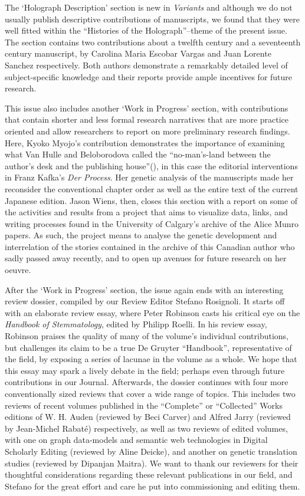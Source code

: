 \begin{preface}
The `Holograph Description' section is new in \emph{Variants} and although we do not usually publish descriptive contributions of manuscripts, we found that they were well fitted within the ``Histories of the Holograph''--theme of the present issue. The section contains two contributions about a twelfth century and a seventeenth century manuscript, by Carolina Maria Escobar Vargas and Juan Lorente Sanchez respectively. Both authors demonstrate a remarkably detailed level of subject-specific knowledge and their reports provide ample incentives for future research. 

This issue also includes another `Work in Progress' section, with contributions that contain shorter and less formal research narratives that are more practice oriented and allow researchers to report on more preliminary research findings. Here, Kyoko Myojo's contribution demonstrates the importance of examining what Van Hulle and Beloborodova called the ``no-man's-land between the author's desk and the publishing house''(\pageref{qtVanhulle2}), in this case the editorial interventions in Franz Kafka's \emph{Der Process}. Her genetic analysis of the manuscripts made her reconsider the conventional chapter order as well as the entire text of the current Japanese edition. Jason Wiens, then, closes this section with a report on some of the activities and results from a project that aims to visualize data, links, and writing processes found in the University of Calgary's archive of the Alice Munro papers. As such, the project means to analyse the genetic development and interrelation of the stories contained in the archive of this Canadian author who sadly passed away recently, and to open up avenues for future research on her oeuvre.

After the `Work in Progress' section, the issue again ends with an interesting review dossier, compiled by our Review Editor Stefano Rosignoli. It starts off with an elaborate review essay, where Peter Robinson casts his critical eye on the \emph{Handbook of Stemmatology}, edited by Philipp Roelli. In his review essay, Robinson praises the quality of many of the volume's individual contributions, but challenges its claim to be a true De Gruyter ``Handbook'', representative of the field, by exposing a series of lacunae in the volume as a whole. We hope that this essay may spark a lively debate in the field; perhaps even through future contributions in our Journal. Afterwards, the dossier continues with four more conventionally sized reviews that cover a wide range of topics. This includes two reviews of recent volumes published in the ``Complete'' or ``Collected'' Works editions of W. H. Auden (reviewed by Beci Carver) and Alfred Jarry (reviewed by Jean-Michel Rabaté) respectively, as well as two reviews of edited volumes, with one on graph data-models and semantic web technologies in Digital Scholarly Editing (reviewed by Aline Deicke), and another on genetic translation studies (reviewed by Dipanjan Maitra). We want to thank our reviewers for their thoughtful considerations regarding these relevant publications in our field, and Stefano for the great effort and care he put into commissioning and  editing them.


\end{preface}
